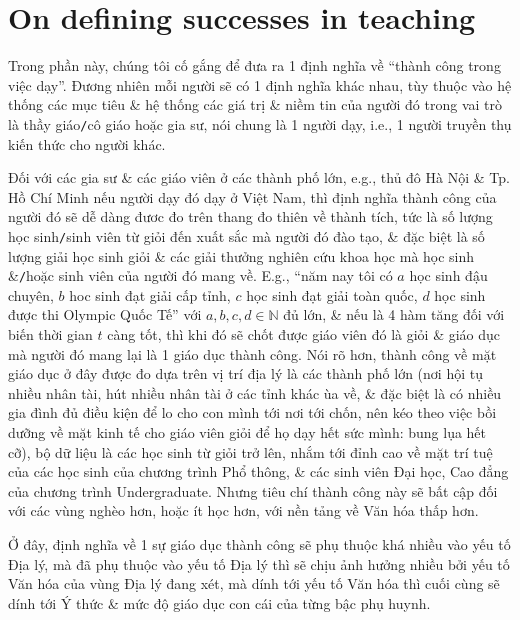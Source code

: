 \documentclass[12pt,twoside]{book}
\begin{document}
\section{On defining successes in teaching}
Trong phần này, chúng tôi cố gắng để đưa ra 1 định nghĩa về ``thành công trong việc dạy''. Đương nhiên mỗi người sẽ có 1 định nghĩa khác nhau, tùy thuộc vào hệ thống các mục tiêu \& hệ thống các giá trị \& niềm tin của người đó trong vai trò là thầy giáo{\tt/}cô giáo hoặc gia sư, nói chung là 1 người dạy, i.e., 1 người truyền thụ kiến thức cho người khác.

Đối với các gia sư \& các giáo viên ở các thành phố lớn, e.g., thủ đô Hà Nội \& Tp. Hồ Chí Minh nếu người dạy đó dạy ở Việt Nam, thì định nghĩa thành công của người đó sẽ dễ dàng đươc đo trên thang đo thiên về thành tích, tức là số lượng học sinh{\tt/}sinh viên từ giỏi đến xuất sắc mà người đó đào tạo, \& đặc biệt là số lượng giải học sinh giỏi \& các giải thưởng nghiên cứu khoa học mà học sinh \&{\tt/}hoặc sinh viên của người đó mang về. E.g., ``năm nay tôi có $a$ học sinh đậu chuyên, $b$ hoc sinh đạt giải cấp tỉnh, $c$ học sinh đạt giải toàn quốc, $d$ học sinh được thi Olympic Quốc Tế'' với $a,b,c,d\in\mathbb{N}$ đủ lớn, \& nếu là 4 hàm tăng đối với biến thời gian $t$ càng tốt, thì khi đó sẽ chốt được giáo viên đó là giỏi \& giáo dục mà người đó mang lại là 1 giáo dục thành công. Nói rõ hơn, thành công về mặt giáo dục ở đây được đo dựa trên vị trí địa lý là các thành phố lớn (nơi hội tụ nhiều nhân tài, hút nhiều nhân tài ở các tỉnh khác ùa về, \& đặc biệt là có nhiều gia đình đủ điều kiện để lo cho con mình tới nơi tới chốn, nên kéo theo việc bồi dưỡng về mặt kinh tế cho giáo viên giỏi để họ dạy hết sức mình: bung lụa hết cỡ), bộ dữ liệu là các học sinh từ giỏi trở lên, nhắm tới đỉnh cao về mặt trí tuệ của các học sinh của chương trình Phổ thông, \& các sinh viên Đại học, Cao đẳng của chương trình Undergraduate. Nhưng tiêu chí thành công này sẽ bất cập đối với các vùng nghèo hơn, hoặc ít học hơn, với nền tảng về Văn hóa thấp hơn.

Ở đây, định nghĩa về 1 sự giáo dục thành công sẽ phụ thuộc khá nhiều vào yếu tố Địa lý, mà đã phụ thuộc vào yếu tố Địa lý thì sẽ chịu ảnh hưởng nhiều bởi yếu tố Văn hóa của vùng Địa lý đang xét, mà dính tới yếu tố Văn hóa thì cuối cùng sẽ dính tới Ý thức \& mức độ giáo dục con cái của từng bậc phụ huynh.
\end{document}
